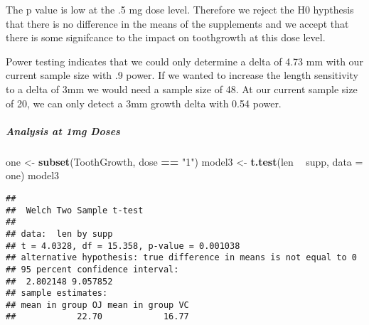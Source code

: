 \documentclass[]{article}
\newenvironment{Shaded}{\begin{snugshade}}{\end{snugshade}}
\newcommand{\DataTypeTok}[1]{\textcolor[rgb]{0.13,0.29,0.53}{#1}}
\newcommand{\DecValTok}[1]{\textcolor[rgb]{0.00,0.00,0.81}{#1}}
\newcommand{\FloatTok}[1]{\textcolor[rgb]{0.00,0.00,0.81}{#1}}
\newcommand{\KeywordTok}[1]{\textcolor[rgb]{0.13,0.29,0.53}{\textbf{#1}}}
\newcommand{\NormalTok}[1]{#1}
\newcommand{\OperatorTok}[1]{\textcolor[rgb]{0.81,0.36,0.00}{\textbf{#1}}}
\newcommand{\StringTok}[1]{\textcolor[rgb]{0.31,0.60,0.02}{#1}}
\let\oldsubparagraph\subparagraph
\renewcommand{\subparagraph}[1]{\oldsubparagraph{#1}\mbox{}}
\begin{document}
The p value is low at the .5 mg dose level. Therefore we reject the H0
hypthesis that there is no difference in the means of the supplements
and we accept that there is some signifcance to the impact on
toothgrowth at this dose level.

Power testing indicates that we could only determine a delta of 4.73 mm
with our current sample size with .9 power. If we wanted to increase the
length sensitivity to a delta of 3mm we would need a sample size of 48.
At our current sample size of 20, we can only detect a 3mm growth delta
with 0.54 power.

\hypertarget{analysis-at-1mg-doses}{%
\subparagraph{Analysis at 1mg Doses}\label{analysis-at-1mg-doses}}

\begin{Shaded}
\begin{Highlighting}[]
\NormalTok{one <-}\StringTok{ }\KeywordTok{subset}\NormalTok{(ToothGrowth, dose }\OperatorTok{==}\StringTok{ "1"}\NormalTok{)}
\NormalTok{model3 <-}\StringTok{ }\KeywordTok{t.test}\NormalTok{(len }\OperatorTok{~}\StringTok{ }\NormalTok{supp, }\DataTypeTok{data =}\NormalTok{ one)}
\NormalTok{model3}
\end{Highlighting}
\end{Shaded}

\begin{verbatim}
## 
##  Welch Two Sample t-test
## 
## data:  len by supp
## t = 4.0328, df = 15.358, p-value = 0.001038
## alternative hypothesis: true difference in means is not equal to 0
## 95 percent confidence interval:
##  2.802148 9.057852
## sample estimates:
## mean in group OJ mean in group VC 
##            22.70            16.77
\end{verbatim}

\begin{Shaded}
\end{Shaded}
\end{document}
